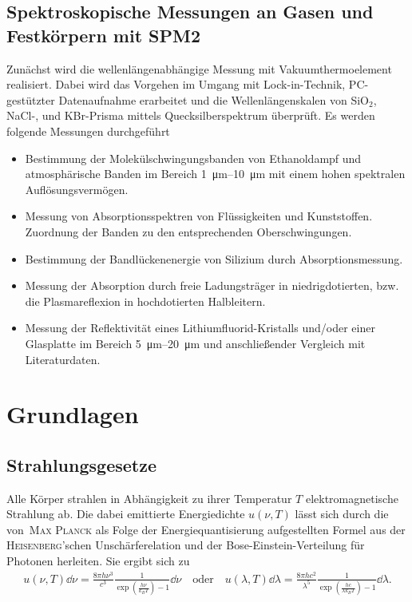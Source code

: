 \documentclass[a4paper,twoside,final]{article}
\begin{document}
\subsection{Spektroskopische Messungen an Gasen und Festkörpern mit SPM2}
Zunächst wird die wellenlängenabhängige Messung mit Vakuumthermoelement realisiert. Dabei wird das Vorgehen im Umgang mit Lock-in-Technik, PC-gestützter Datenaufnahme erarbeitet und die Wellenlängenskalen von SiO$_2$, NaCl-, und KBr-Prisma mittels Quecksilberspektrum überprüft. Es werden folgende Messungen durchgeführt
\begin{itemize}
  \item Bestimmung der Molekülschwingungsbanden von Ethanoldampf und atmosphärische Banden im Bereich \SIrange{1}{10}{\micro\metre} mit einem hohen spektralen Auflösungsvermögen.
  \item Messung von Absorptionsspektren von Flüssigkeiten und Kunststoffen. Zuordnung der Banden zu den entsprechenden Oberschwingungen.
  \item Bestimmung der Bandlückenenergie von Silizium durch Absorptionsmessung.
  \item Messung der Absorption durch freie Ladungsträger in niedrigdotierten, bzw. die Plasmareflexion in hochdotierten Halbleitern.
  \item Messung der Reflektivität eines Lithiumfluorid-Kristalls und/oder einer Glasplatte im Bereich \SIrange{5}{20}{\micro\metre} und anschließender Vergleich mit Literaturdaten.
\end{itemize}

\newpage
\section{Grundlagen} \label{sec:Grundlagen}
\subsection{Strahlungsgesetze}
Alle Körper strahlen in Abhängigkeit zu ihrer Temperatur $T$ elektromagnetische Strahlung ab. Die dabei emittierte Energiedichte $u(\nu,T)$ lässt sich durch die von~\textsc{Max Planck} als Folge der Energiequantisierung aufgestellten Formel aus der \textsc{Heisenberg}'schen Unschärferelation und der Bose-Einstein-Verteilung für Photonen herleiten. Sie ergibt sich zu~\cite[75]{Demtroder}
\begin{align}\label{eqn:2.1}
    u(\nu,T)\dd{\nu} = \frac{8\pi h \nu^3}{c^3}\frac{1}{\exp(\frac{h\nu}{k_B T})-1}\dd{\nu} \quad\text{oder}\quad u(\lambda,T)\dd{\lambda} = \frac{8\pi h c^2}{\lambda^5}\frac{1}{\exp(\frac{hc}{\lambda k_B T})-1}\dd{\lambda}.
\end{align}
\end{document}
